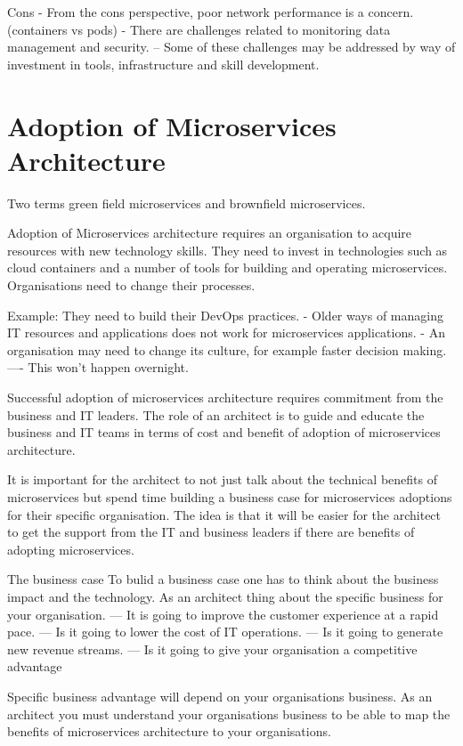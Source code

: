 \documentclass[a4paper, 11pt]{book}
\begin{document}
    Cons
    - From the cons perspective, poor network performance is a concern. (containers vs pods)
    - There are challenges related to monitoring data management and security.
    -- Some of these challenges may be addressed by way of investment in tools, infrastructure and skill development.


    \section{Adoption of Microservices Architecture}

    Two terms green field microservices and brownfield microservices.

    Adoption of Microservices architecture requires an organisation to acquire resources with new technology skills.
    They need to invest in technologies such as cloud containers and a number of tools for building and operating microservices.
    Organisations need to change their processes.

    Example: They need to build their DevOps practices.
    - Older ways of managing IT resources and applications does not work for microservices applications.
    - An organisation may need to change its culture, for example faster decision making.
    ---- This won't happen overnight.

    Successful adoption of microservices architecture requires commitment from the business and IT leaders.
    The role of an architect is to guide and educate the business and IT teams in terms of cost and benefit of adoption of microservices architecture.

    It is important for the architect to not just talk about the technical benefits of microservices but spend time building a business case for microservices adoptions for their specific organisation.
    The idea is that it will be easier for the architect to get the support from the IT and business leaders if there are benefits of adopting microservices.

    The business case
    To bulid a business case one has to think about the business impact and the technology.
    As an architect thing about the specific business for your organisation.
    --- It is going to improve the customer experience at a rapid pace.
    --- Is it going to lower the cost of IT operations.
    --- Is it going to generate new revenue streams.
    --- Is it going to give your organisation a competitive advantage

    Specific business advantage will depend on your organisations business.
    As an architect you must understand your organisations business to be able to map the benefits of microservices architecture to your organisations.
\end{document}
